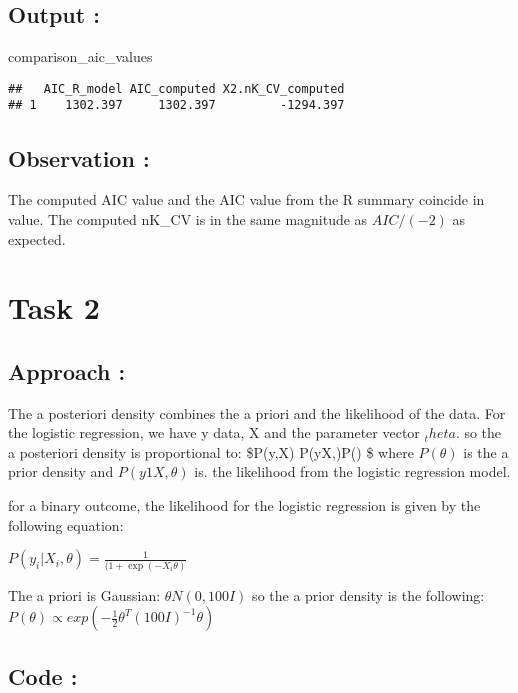 \documentclass[
]{article}
\newenvironment{Shaded}{\begin{snugshade}}{\end{snugshade}}
\newcommand{\NormalTok}[1]{#1}
\begin{document}
\subsection{Output :}\label{output}

\begin{Shaded}
\begin{Highlighting}[]
\NormalTok{comparison\_aic\_values}
\end{Highlighting}
\end{Shaded}

\begin{verbatim}
##   AIC_R_model AIC_computed X2.nK_CV_computed
## 1    1302.397     1302.397         -1294.397
\end{verbatim}

\subsection{Observation :}\label{observation}

The computed AIC value and the AIC value from the R summary coincide in
value. The computed nK\_CV is in the same magnitude as \(AIC/(-2)\) as
expected.

\section{Task 2}\label{task-2}

\subsection{Approach :}\label{approach-1}

The a posteriori density combines the a priori and the likelihood of the
data. For the logistic regression, we have y data, X and the parameter
vector \(_theta\). so the a posteriori density is proportional to:
\$P(\theta\textbar y,X) \propto P(y\textbar X,\theta)P(\theta) \$ where
\(P(\theta)\) is the a prior density and \(P(y1X,\theta)\) is. the
likelihood from the logistic regression model.

for a binary outcome, the likelihood for the logistic regression is
given by the following equation:

\(P(y_{i}|X_{i},\theta) =  \frac{1}{(1+\exp(-X_{i}\theta)}\)

The a priori is Gaussian: \(\theta N(0, 100I)\) so the a prior density
is the following:
\(P(\theta) \propto exp(-\frac{1}{2}\theta^T(100I)^{-1}\theta)\)

\subsection{Code :}\label{code-1}
\end{document}

